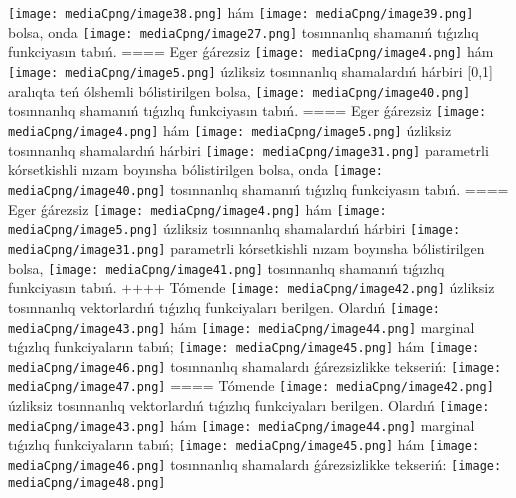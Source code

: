 \texttt{[image: mediaCpng/image38.png]} hám \texttt{[image: mediaCpng/image39.png]}
bolsa, onda \texttt{[image: mediaCpng/image27.png]} tosınnanlıq shamanıń tıǵızlıq funkciyasın tabıń.
====
Eger ǵárezsiz \texttt{[image: mediaCpng/image4.png]} hám \texttt{[image: mediaCpng/image5.png]} úzliksiz tosınnanlıq shamalardıń hárbiri {[}0,1{]} aralıqta teń ólshemli bólistirilgen bolsa, \texttt{[image: mediaCpng/image40.png]} tosınnanlıq shamanıń tıǵızlıq funkciyasın tabıń.
====
Eger ǵárezsiz \texttt{[image: mediaCpng/image4.png]} hám \texttt{[image: mediaCpng/image5.png]} úzliksiz tosınnanlıq shamalardıń hárbiri \texttt{[image: mediaCpng/image31.png]} parametrli
kórsetkishli nızam boyınsha bólistirilgen bolsa, onda \texttt{[image: mediaCpng/image40.png]} tosınnanlıq shamanıń
tıǵızlıq funkciyasın tabıń.
====
Eger ǵárezsiz \texttt{[image: mediaCpng/image4.png]} hám \texttt{[image: mediaCpng/image5.png]} úzliksiz tosınnanlıq shamalardıń hárbiri \texttt{[image: mediaCpng/image31.png]} parametrli kórsetkishli nızam boyınsha bólistirilgen bolsa, \texttt{[image: mediaCpng/image41.png]} tosınnanlıq shamanıń tıǵızlıq funkciyasın tabıń.
++++
Tómende \texttt{[image: mediaCpng/image42.png]} úzliksiz tosınnanlıq vektorlardıń tıǵızlıq funkciyaları berilgen. Olardıń \texttt{[image: mediaCpng/image43.png]} hám \texttt{[image: mediaCpng/image44.png]} marginal tıǵızlıq funkciyaların tabıń; \texttt{[image: mediaCpng/image45.png]} hám \texttt{[image: mediaCpng/image46.png]} tosınnanlıq shamalardı ǵárezsizlikke tekseriń: \texttt{[image: mediaCpng/image47.png]}
====
Tómende \texttt{[image: mediaCpng/image42.png]} úzliksiz tosınnanlıq vektorlardıń tıǵızlıq funkciyaları berilgen. Olardıń \texttt{[image: mediaCpng/image43.png]} hám \texttt{[image: mediaCpng/image44.png]} marginal tıǵızlıq funkciyaların tabıń; \texttt{[image: mediaCpng/image45.png]} hám \texttt{[image: mediaCpng/image46.png]} tosınnanlıq shamalardı ǵárezsizlikke tekseriń: \texttt{[image: mediaCpng/image48.png]}
